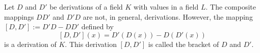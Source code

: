 Let $D$ and $D'$ be derivations of a field $K$ with values in a field $L$. The composite mappings $D D'$ and $D' D$ are not, in general, derivations. However, the mapping $[D, D'] := D' D - D D'$ defined by
$$[D, D'](x) = D'(D(x)) - D(D'(x))$$
is a derivation of $K$. This derivation $[D, D']$ is called the bracket of $D$ and $D'$.
